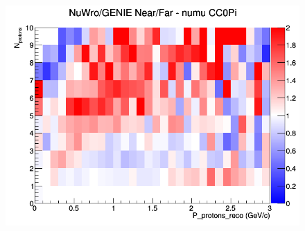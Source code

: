 \documentclass[12pt]{article}
\begin{document}
\begin{figure}[h]
\endminipage
{}
\includegraphics[width=\linewidth]{eff_N_P/GAr/protons/ratios/CC0Pi_NuWro_GENIE_numu_NF_N_P.png}
\endminipage
\newline
\end{figure}
\clearpage
\end{document}

